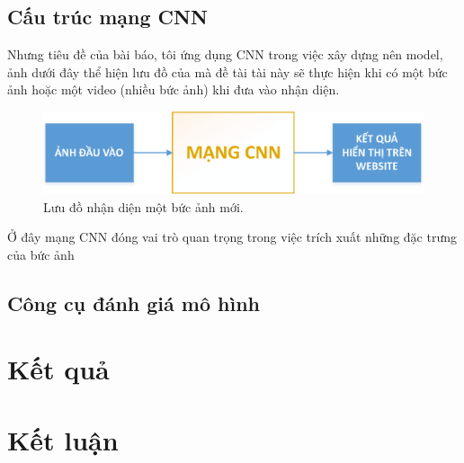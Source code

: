 \documentclass[12pt,a4paper]{article}
\begin{document}
	\subsection{Cấu trúc mạng CNN}
	
	Nhưng tiêu đề của bài báo, tôi ứng dụng CNN trong việc xây dựng nên model, ảnh dưới đây thể hiện lưu đồ của mà đề tài tài này sẽ thực hiện khi có một bức ảnh hoặc một video (nhiều bức ảnh) khi đưa vào nhận diện.
	
	\begin{figure}[h!]
		\centering
		\includegraphics[width=0.8\linewidth]{./images/soDo_1.eps}
		\caption{Lưu đồ nhận diện một bức ảnh mới.}
		\label{fig:soDo1}
	\end{figure}

	\noindent
	Ở đây mạng CNN đóng vai trò quan trọng trong việc trích xuất những đặc trưng của bức ảnh
	
	\subsection{Công cụ đánh giá mô hình}
	
	
	\section{Kết quả}
	
	
	\section{Kết luận}
\end{document}
